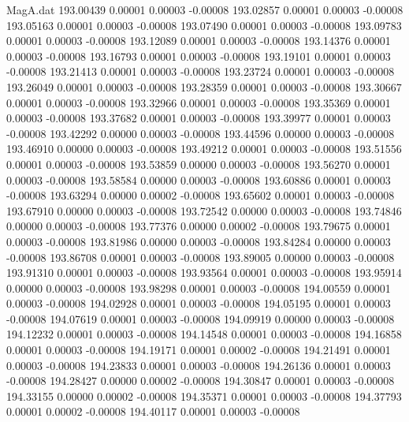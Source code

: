 \begin{filecontents}{MagA.dat}
 193.00439    0.00001    0.00003   -0.00008
 193.02857    0.00001    0.00003   -0.00008
 193.05163    0.00001    0.00003   -0.00008
 193.07490    0.00001    0.00003   -0.00008
 193.09783    0.00001    0.00003   -0.00008
 193.12089    0.00001    0.00003   -0.00008
 193.14376    0.00001    0.00003   -0.00008
 193.16793    0.00001    0.00003   -0.00008
 193.19101    0.00001    0.00003   -0.00008
 193.21413    0.00001    0.00003   -0.00008
 193.23724    0.00001    0.00003   -0.00008
 193.26049    0.00001    0.00003   -0.00008
 193.28359    0.00001    0.00003   -0.00008
 193.30667    0.00001    0.00003   -0.00008
 193.32966    0.00001    0.00003   -0.00008
 193.35369    0.00001    0.00003   -0.00008
 193.37682    0.00001    0.00003   -0.00008
 193.39977    0.00001    0.00003   -0.00008
 193.42292    0.00000    0.00003   -0.00008
 193.44596    0.00000    0.00003   -0.00008
 193.46910    0.00000    0.00003   -0.00008
 193.49212    0.00001    0.00003   -0.00008
 193.51556    0.00001    0.00003   -0.00008
 193.53859    0.00000    0.00003   -0.00008
 193.56270    0.00001    0.00003   -0.00008
 193.58584    0.00000    0.00003   -0.00008
 193.60886    0.00001    0.00003   -0.00008
 193.63294    0.00000    0.00002   -0.00008
 193.65602    0.00001    0.00003   -0.00008
 193.67910    0.00000    0.00003   -0.00008
 193.72542    0.00000    0.00003   -0.00008
 193.74846    0.00000    0.00003   -0.00008
 193.77376    0.00000    0.00002   -0.00008
 193.79675    0.00001    0.00003   -0.00008
 193.81986    0.00000    0.00003   -0.00008
 193.84284    0.00000    0.00003   -0.00008
 193.86708    0.00001    0.00003   -0.00008
 193.89005    0.00000    0.00003   -0.00008
 193.91310    0.00001    0.00003   -0.00008
 193.93564    0.00001    0.00003   -0.00008
 193.95914    0.00000    0.00003   -0.00008
 193.98298    0.00001    0.00003   -0.00008
 194.00559    0.00001    0.00003   -0.00008
 194.02928    0.00001    0.00003   -0.00008
 194.05195    0.00001    0.00003   -0.00008
 194.07619    0.00001    0.00003   -0.00008
 194.09919    0.00000    0.00003   -0.00008
 194.12232    0.00001    0.00003   -0.00008
 194.14548    0.00001    0.00003   -0.00008
 194.16858    0.00001    0.00003   -0.00008
 194.19171    0.00001    0.00002   -0.00008
 194.21491    0.00001    0.00003   -0.00008
 194.23833    0.00001    0.00003   -0.00008
 194.26136    0.00001    0.00003   -0.00008
 194.28427    0.00000    0.00002   -0.00008
 194.30847    0.00001    0.00003   -0.00008
 194.33155    0.00000    0.00002   -0.00008
 194.35371    0.00001    0.00003   -0.00008
 194.37793    0.00001    0.00002   -0.00008
 194.40117    0.00001    0.00003   -0.00008

\end{filecontents}
